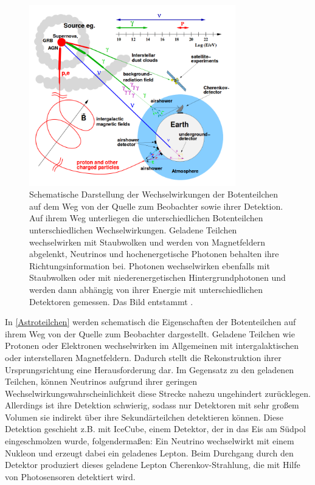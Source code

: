 \begin{figure}
    \centering
    \includegraphics[width=0.8\textwidth]{./Plots/02_Astroteilchenphysik/Astroteilchen.png}
    \caption{Schematische Darstellung der Wechselwirkungen der Botenteilchen auf dem Weg von der Quelle zum Beobachter sowie ihrer Detektion.
    Auf ihrem Weg unterliegen die unterschiedlichen Botenteilchen unterschiedlichen Wechselwirkungen. 
    Geladene Teilchen wechselwirken mit Staubwolken und werden von Magnetfeldern abgelenkt, Neutrinos und hochenergetische Photonen behalten ihre Richtungsinformation bei.
    Photonen wechselwirken ebenfalls mit Staubwolken oder mit niederenergetischen Hintergrundphotonen und werden dann abhängig von ihrer Energie mit unterschiedlichen Detektoren gemessen. 
    Das Bild entstammt \cite{DissMarlene}.}
    \label{Astroteilchen}
\end{figure}

In \autoref{Astroteilchen} werden schematisch die Eigenschaften der Botenteilchen auf ihrem Weg von der Quelle zum Beobachter dargestellt.
Geladene Teilchen wie Protonen oder Elektronen wechselwirken im Allgemeinen mit intergalaktischen oder interstellaren Magnetfeldern.
Dadurch stellt die Rekonstruktion ihrer Ursprungsrichtung eine Herausforderung dar.
Im Gegensatz zu den geladenen Teilchen, können Neutrinos aufgrund ihrer geringen Wechselwirkungswahrscheinlichkeit diese Strecke nahezu ungehindert zurücklegen. 
Allerdings ist ihre Detektion schwierig, sodass nur Detektoren mit sehr großem Volumen sie indirekt über ihre Sekundärteilchen detektieren können.
Diese Detektion geschieht z.B. mit IceCube, einem Detektor, der in das Eis am Südpol eingeschmolzen wurde, folgendermaßen:
Ein Neutrino wechselwirkt mit einem Nukleon und erzeugt dabei ein geladenes Lepton. 
Beim Durchgang durch den Detektor produziert dieses geladene Lepton Cherenkov-Strahlung, die mit Hilfe von Photosensoren detektiert wird.

